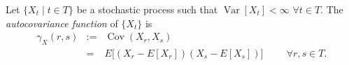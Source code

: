\documentclass[12pt]{article}
\newcommand{\tmop}[1]{\ensuremath{\operatorname{#1}}}
\newcommand{\assign}{:=}
\renewcommand{\mathbbm}{}
\begin{document}
 Let $\{ X_t\mid t \in T \}$ be a stochastic process such that
 $\tmop{Var}[X_t] < \infty$ $\forall t \in T$. The \emph{autocovariance function} of
 $\{ X_t \}$ is
\begin{eqnarray*}
\gamma_X ( r, s ) & \assign & \tmop{Cov} ( X_r, X_s )\\
& = & \mathbbm{E}\big[ ( X_r -\mathbbm{E}[X_r] ) ( X_s -\mathbbm{E}[X_s] ) \big]
\hspace{1cm} \forall r, s \in T.
\end{eqnarray*}
\end{document}

